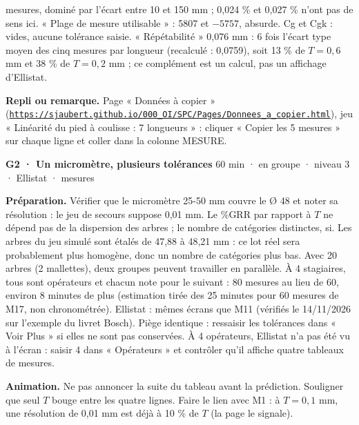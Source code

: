 mesures, dominé par l'écart entre 10 et 150 mm ; 0,024 \% et 0,027 \% n'ont pas de sens ici. « Plage de mesure utilisable » : 5807 et $-5757$, absurde. Cg et Cgk : vides, aucune tolérance saisie. « Répétabilité » 0,076 mm : 6 fois l'écart type moyen des cinq mesures par longueur (recalculé : 0,0759), soit 13 \% de $T = 0{,}6$ mm et 38 \% de $T = 0{,}2$ mm ; ce complément est un calcul, pas un affichage d'Ellistat.\par
{\small\textbf{Repli ou remarque.} Page « Données à copier » (\href{https://sjaubert.github.io/000_OI/SPC/Pages/Donnees_a_copier.html}{\nolinkurl{https://sjaubert.github.io/000_OI/SPC/Pages/Donnees_a_copier.html}}), jeu « Linéarité du pied à coulisse : 7 longueurs » : cliquer « Copier les 5 mesures » sur chaque ligne et coller dans la colonne MESURE.}\par
\vspace{3pt}
\begin{tcolorbox}[act]\textbf{G2 · Un micromètre, plusieurs tolérances} \hfill {\small 60 min · en groupe · niveau 3 · Ellistat · mesures}\end{tcolorbox}
\textbf{Préparation.} Vérifier que le micromètre 25-50 mm couvre le Ø 48 et noter sa résolution : le jeu de secours suppose 0,01 mm. Le \%GRR par rapport à $T$ ne dépend pas de la dispersion des arbres ; le nombre de catégories distinctes, si. Les arbres du jeu simulé sont étalés de 47,88 à 48,21 mm : ce lot réel sera probablement plus homogène, donc un nombre de catégories plus bas. Avec 20 arbres (2 mallettes), deux groupes peuvent travailler en parallèle. À 4 stagiaires, tous sont opérateurs et chacun note pour le suivant : 80 mesures au lieu de 60, environ 8 minutes de plus (estimation tirée des 25 minutes pour 60 mesures de M17, non chronométrée). Ellistat : mêmes écrans que M11 (vérifiés le 14/11/2026 sur l'exemple du livret Bosch). Piège identique : ressaisir les tolérances dans « Voir Plus » si elles ne sont pas conservées. À 4 opérateurs, Ellistat n'a pas été vu à l'écran : saisir 4 dans « Opérateurs » et contrôler qu'il affiche quatre tableaux de mesures.\par
\textbf{Animation.} Ne pas annoncer la suite du tableau avant la prédiction. Souligner que seul $T$ bouge entre les quatre lignes. Faire le lien avec M1 : à $T = 0{,}1$ mm, une résolution de 0,01 mm est déjà à 10 \% de $T$ (la page le signale).\par
